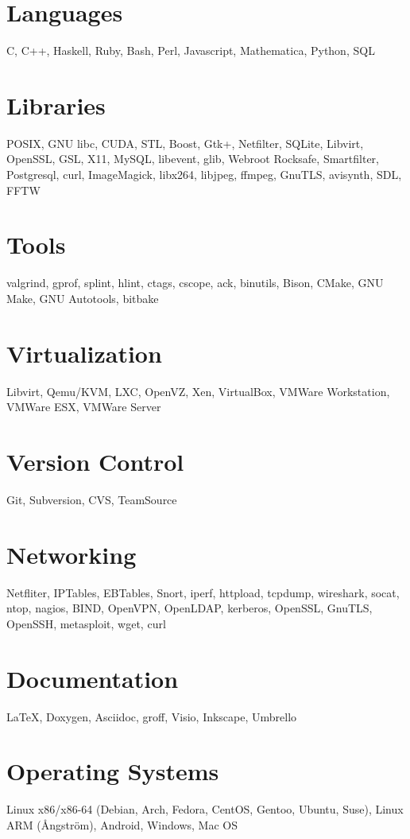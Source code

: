 \documentclass[margin,line]{resume}
\begin{document}
\begin{resume}
\section{\mysidestyle \textbf{Languages}}
C, C++, Haskell, Ruby, Bash, Perl, Javascript, Mathematica, Python, SQL

\section{\mysidestyle \textbf{Libraries}}
POSIX, GNU libc, CUDA, STL, Boost, Gtk+, Netfilter, SQLite, Libvirt, OpenSSL, GSL,
X11, MySQL, libevent, glib, Webroot Rocksafe, Smartfilter, Postgresql, curl,
ImageMagick, libx264, libjpeg, ffmpeg, GnuTLS, avisynth, SDL, FFTW

\section{\mysidestyle \textbf{Tools}}
valgrind, gprof, splint, hlint, ctags, cscope, ack, binutils, Bison, CMake, GNU Make,
GNU Autotools, bitbake

\section{\mysidestyle \textbf{Virtualization}}
Libvirt, Qemu/KVM, LXC, OpenVZ, Xen, VirtualBox, VMWare Workstation, VMWare ESX, VMWare Server

\section{\mysidestyle \textbf{Version Control}}
Git, Subversion, CVS, TeamSource

\section{\mysidestyle \textbf{Networking}}
Netfliter, IPTables, EBTables, Snort, iperf, httpload, tcpdump, wireshark, socat, ntop,
nagios, BIND, OpenVPN, OpenLDAP, kerberos, OpenSSL, GnuTLS, OpenSSH,
metasploit, wget, curl

\section{\mysidestyle \textbf{Documentation}}
\LaTeX, Doxygen, Asciidoc, groff, Visio, Inkscape, Umbrello

\section{\mysidestyle \textbf{Operating Systems}}
Linux x86/x86-64 (Debian, Arch, Fedora, CentOS, Gentoo, Ubuntu, Suse), Linux ARM ({\AA}ngstr\"{o}m), Android, Windows, Mac OS


\end{resume}
\end{document}
